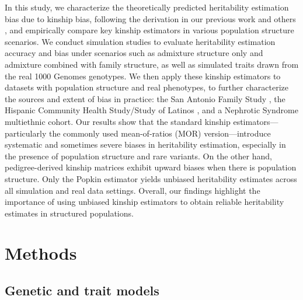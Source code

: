 \documentclass[11pt]{article}
\begin{document}
In this study, we characterize the theoretically predicted heritability estimation bias due to kinship bias, following the derivation in our previous work \citep{hou2023genetic} and others \citep{chen2022kinship}, and empirically compare key kinship estimators in various population structure scenarios. We conduct simulation studies to evaluate heritability estimation accuracy and bias under scenarios such as admixture structure only and admixture combined with family structure, as well as simulated traits drawn from the real 1000 Genomes genotypes. We then apply these kinship estimators to datasets with population structure and real phenotypes, to further characterize the sources and extent of bias in practice: the San Antonio Family Study
\citep{mitchell1996genetic}, the Hispanic Community Health Study/Study of Latinos \citep{sorlie2010design}, and a Nephrotic Syndrome multiethnic cohort. Our results show that the standard kinship estimators—particularly the commonly used mean-of-ratios (MOR) version—introduce systematic and sometimes severe biases in heritability estimation, especially in the presence of population structure and rare variants. On the other hand, pedigree-derived kinship matrices exhibit upward biases when there is population structure.  Only the Popkin estimator yields unbiased heritability estimates across all simulation and real data settings. Overall, our findings highlight the importance of using unbiased kinship estimators to obtain reliable heritability estimates in structured populations.


\section{Methods}

\subsection{Genetic and trait models}
\end{document}
